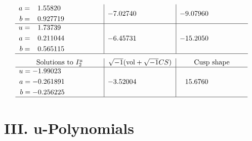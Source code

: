 \documentclass[1p]{elsarticle_modified}
\theoremstyle{definition}
\newcommand{\I}{\sqrt{-1}}
\begin{document}
$$\begin{array}{c|c|c}
\begin{aligned}
a &= \phantom{-}1.55820\phantom{ +0.000000I} \\
b &= \phantom{-}0.927719\phantom{ +0.000000I}\end{aligned}
 & -7.02740\phantom{ +0.000000I} & -9.07960\phantom{ +0.000000I} \\ \hline\begin{aligned}
u &= \phantom{-}1.73739\phantom{ +0.000000I} \\
a &= \phantom{-}0.211044\phantom{ +0.000000I} \\
b &= \phantom{-}0.565115\phantom{ +0.000000I}\end{aligned}
 & -6.45731\phantom{ +0.000000I} & -15.2050\phantom{ +0.000000I}\\
 \hline 
 \end{array}$$\newpage$$\begin{array}{c|c|c}  
\text{Solutions to }I^u_{2}& \I (\text{vol} + \sqrt{-1}CS) & \text{Cusp shape}\\
 \hline 
\begin{aligned}
u &= -1.99023\phantom{ +0.000000I} \\
a &= -0.261891\phantom{ +0.000000I} \\
b &= -0.256225\phantom{ +0.000000I}\end{aligned}
 & -3.52004\phantom{ +0.000000I} & \phantom{-}15.6760\phantom{ +0.000000I}\\
 \hline 
 \end{array}$$\newpage
\newpage\renewcommand{\arraystretch}{1}
\centering \section*{ III. u-Polynomials}
\end{document}
